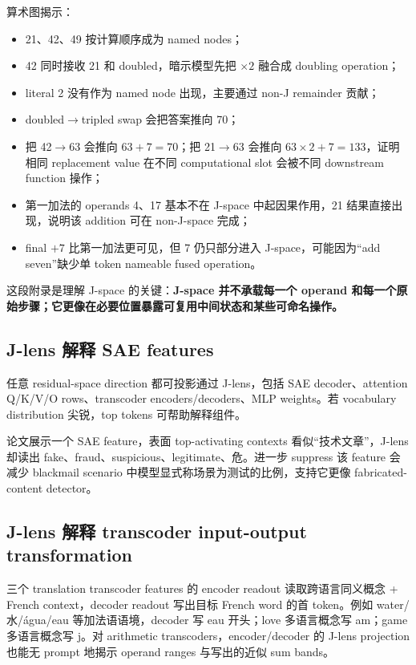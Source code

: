 \documentclass[10.5pt,a4paper]{ctexart}
\begin{document}
算术图揭示：
\begin{itemize}
\item 21、42、49 按计算顺序成为 named nodes；
\item 42 同时接收 21 和 doubled，暗示模型先把 $\times2$ 融合成 doubling operation；
\item literal 2 没有作为 named node 出现，主要通过 non-J remainder 贡献；
\item doubled$\to$tripled swap 会把答案推向 70；
\item 把 42$\to$63 会推向 $63+7=70$；把 21$\to$63 会推向 $63\times2+7=133$，证明相同 replacement value 在不同 computational slot 会被不同 downstream function 操作；
\item 第一加法的 operands 4、17 基本不在 J-space 中起因果作用，21 结果直接出现，说明该 addition 可在 non-J-space 完成；
\item final $+7$ 比第一加法更可见，但 7 仍只部分进入 J-space，可能因为“add seven”缺少单 token nameable fused operation。
\end{itemize}

这段附录是理解 J-space 的关键：\textbf{J-space 并不承载每一个 operand 和每一个原始步骤；它更像在必要位置暴露可复用中间状态和某些可命名操作。}

\subsection{J-lens 解释 SAE features}
任意 residual-space direction 都可投影通过 J-lens，包括 SAE decoder、attention Q/K/V/O rows、transcoder encoders/decoders、MLP weights。若 vocabulary distribution 尖锐，top tokens 可帮助解释组件。

论文展示一个 SAE feature，表面 top-activating contexts 看似“技术文章”，J-lens 却读出 fake、fraud、suspicious、legitimate、危。进一步 suppress 该 feature 会减少 blackmail scenario 中模型显式称场景为测试的比例，支持它更像 fabricated-content detector。

\subsection{J-lens 解释 transcoder input-output transformation}
三个 translation transcoder features 的 encoder readout 读取跨语言同义概念 + French context，decoder readout 写出目标 French word 的首 token。例如 water/水/água/eau 等加法语语境，decoder 写 eau 开头；love 多语言概念写 am；game 多语言概念写 j。对 arithmetic transcoders，encoder/decoder 的 J-lens projection 也能无 prompt 地揭示 operand ranges 与写出的近似 sum bands。
\end{document}
